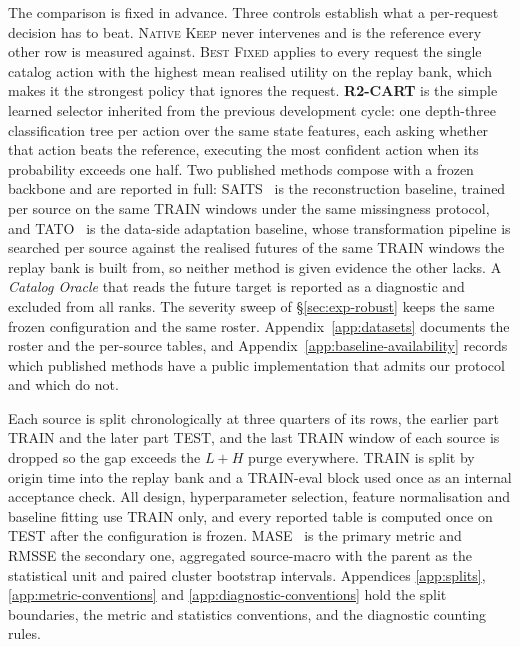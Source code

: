 \documentclass{article}
\begin{document}
The comparison is fixed in advance. Three controls establish what a per-request decision has to
beat. \textsc{Native Keep} never intervenes and is the reference every other row is measured
against. \textsc{Best Fixed} applies to every request the single catalog action with the
highest mean realised utility on the replay bank, which makes it the strongest policy that
ignores the request. \textbf{R2-CART} is the simple learned selector inherited from the
previous development cycle: one depth-three classification tree per action over the same state
features, each asking whether that action beats the reference, executing the most confident
action when its probability exceeds one half. Two published methods compose with a frozen
backbone and are reported in full: SAITS~\citep{du2023saits,du2023pypots} is the
reconstruction baseline, trained per source on the same TRAIN windows under the same
missingness protocol, and TATO~\citep{qiu2026tato} is the data-side adaptation baseline, whose
transformation pipeline is searched per source against the realised futures of the same TRAIN
windows the replay bank is built from, so neither method is given evidence the other lacks. A
\emph{Catalog Oracle} that reads the future target is reported as a diagnostic and excluded
from all ranks.
The severity sweep of \S\ref{sec:exp-robust} keeps the same frozen configuration and the same
roster. Appendix~\ref{app:datasets} documents the roster and the per-source tables, and
Appendix~\ref{app:baseline-availability} records which published methods have a public
implementation that admits our protocol and which do not.

Each source is split chronologically at three quarters of its rows, the earlier part TRAIN and
the later part TEST, and the last TRAIN window of each source is dropped so the gap exceeds the
$L + H$ purge everywhere. TRAIN is split by origin time into the replay bank and a TRAIN-eval
block used once as an internal acceptance check. All design, hyperparameter selection, feature
normalisation and baseline fitting use TRAIN only, and every reported table is computed once on
TEST after the configuration is frozen. MASE~\citep{hyndman2006mase} is the primary metric and
RMSSE the secondary one, aggregated source-macro with the parent as the statistical unit and
paired cluster bootstrap intervals. Appendices \ref{app:splits},
\ref{app:metric-conventions} and \ref{app:diagnostic-conventions} hold the split boundaries,
the metric and statistics conventions, and the diagnostic counting rules.
\end{document}
